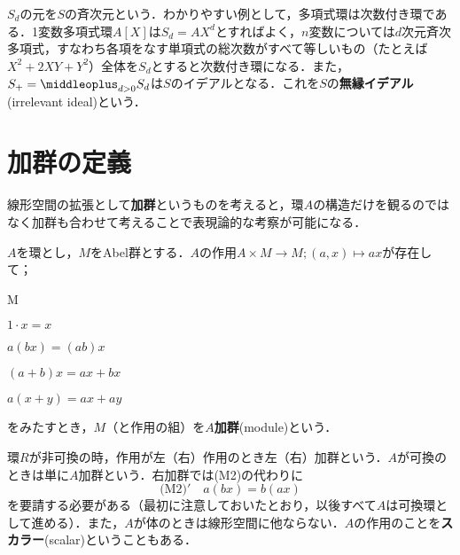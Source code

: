 $S_d$の元を$S$の斉次元という．わかりやすい例として，多項式環は次数付き環である．1変数多項式環$A[X]$は$S_d=AX^d$とすればよく，$n$変数については$d$次元斉次多項式，すなわち各項をなす単項式の総次数がすべて等しいもの（たとえば$X^2+2XY+Y^2$）全体を$S_d$とすると次数付き環になる．また，$S_+=\middleoplus_{d>0}S_d$は$S$のイデアルとなる．これを$S$の\textbf{無縁イデアル}(irrelevant ideal)という．


\section{加群の定義}

線形空間の拡張として\textbf{加群}というものを考えると，環$A$の構造だけを観るのではなく加群も合わせて考えることで表現論的な考察が可能になる．

\begin{defi}[加群]
	$A$を環とし，$M$をAbel群とする．$A$の作用$A\times M\to M;(a,x)\mapsto ax$が存在して；
	\begin{defiterm}{M}
		\item $1\cdot x=x$
		\item $a(bx)=(ab)x$
		\item $(a+b)x=ax+bx$
		\item $a(x+y)=ax+ay$
	\end{defiterm}
	をみたすとき，$M$（と作用の組）を$A$\textbf{加群}(module)という．
\end{defi}

環$R$が非可換の時，作用が左（右）作用のとき左（右）加群という．$A$が可換のときは単に$A$加群という．右加群では(M2)の代わりに
\[\textrm{(M2)}'\quad a(bx)=b(ax)\]
を要請する必要がある（最初に注意しておいたとおり，以後すべて$A$は可換環として進める）．また，$A$が体のときは線形空間に他ならない．$A$の作用のことを\textbf{スカラー}(scalar)ということもある．

